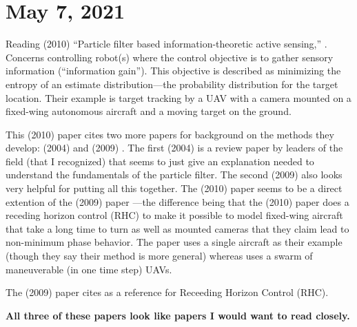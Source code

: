\documentclass{article}
\begin{document}
\section{May 7, 2021}

Reading (2010) ``Particle filter based information-theoretic active
sensing,'' \cite{ryan2010particle}.  Concerns controlling robot(s)
where the control objective is to gather sensory information
(``information gain'').  This objective is described as minimizing the
entropy of an estimate distribution---the probability distribution for
the target location.  Their example is target tracking by a UAV with a
camera mounted on a fixed-wing autonomous aircraft and a moving target
on the ground.

This (2010) paper \cite{ryan2010particle} cites two more papers for
background on the methods they develop: (2004)
\cite{andrieu2004particle} and (2009) \cite{hoffmann2009mobile}.  The
first (2004) \cite{andrieu2004particle} is a review paper by leaders
of the field (that I recognized) that seems to just give an
explanation needed to understand the fundamentals of the particle
filter.  The second (2009) \cite{hoffmann2009mobile} also looks very
helpful for putting all this together.  The (2010) paper
\cite{ryan2010particle} seems to be a direct extention of the (2009)
paper \cite{hoffmann2009mobile}---the difference being that the (2010)
paper does a receding horizon control (RHC) to make it possible to
model fixed-wing aircraft that take a long time to turn as well as
mounted cameras that they claim lead to non-minimum phase behavior.
The paper \cite{ryan2010particle} uses a single aircraft as their
example (though they say their method is more general) whereas
\cite{hoffmann2009mobile} uses a swarm of maneuverable (in one time
step) UAVs.

The (2009) \cite{hoffmann2009mobile} paper cites
\cite{andrieu2004particle} as a reference for Receeding Horizon
Control (RHC).

\textbf{All three of these papers look like papers I would want to
  read closely.}

\nocite{*}



\end{document}
